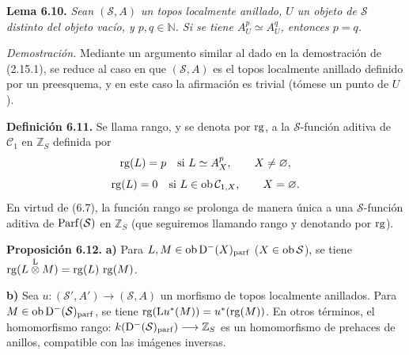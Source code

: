 
\providecommand{\sisi}[2]{#2}

\textbf{Lema 6.10.} \emph{Sean \((\sisi{S}{\mathcal S},A)\) un topos localmente anillado, \(U\) un objeto de \(\sisi{S}{\mathcal S}\) distinto del objeto vacío, y \(p,q\in\mathbb N\). Si se tiene \(A_U^p\simeq A_U^q\), entonces \(p=q\).}

\emph{Demostración.} Mediante un argumento similar al dado en la demostración de (2.15.1), se reduce al caso en que \((\sisi{S}{\mathcal S},A)\) es el topos localmente anillado definido por un preesquema, y en este caso la afirmación es trivial (tómese un punto de \(U\)).

\textbf{Definición 6.11.} Se llama rango, y se denota por \(\operatorname{rg}\), a la \(\sisi{S}{\mathcal S}\)-función aditiva de \(\mathcal C_1\) en \(\mathbb Z_S\) definida por
\[
  \operatorname{rg}(L)=p\quad\text{si } L\simeq A_X^p,
  \qquad X\ne\varnothing,
\]
\[
  \rg(L)=0\quad\text{si } L\in\Ob\sisi{\mathcal C_{1X}}{\mathcal C_{1,X}},
  \qquad X=\varnothing.
\]
En virtud de (6.7), la función rango se prolonga de manera única a una \(\sisi{S}{\mathcal S}\)-función aditiva de \(\Parf(\sisi{S}{\mathcal S})\) en \(\mathbb Z_S\) (que seguiremos llamando rango y denotando por \(\operatorname{rg}\)).

\textbf{Proposición 6.12.} \textbf{a)} Para \(L,M\in\operatorname{ob}\mathrm D^-(X)_{\mathrm{parf}}\) (\(X\in\Ob \sisi{S}{\mathcal S}\)), se tiene \(\operatorname{rg}(L\overset{\mathrm L}{\otimes} M)=\operatorname{rg}(L)\,\operatorname{rg}(M)\).

\textbf{b)} Sea \(u:(\sisi{S'}{\mathcal S'},A')\longrightarrow(\sisi{S}{\mathcal S},A)\) un morfismo de topos localmente anillados. Para \(M\in\Ob\Dpx^-(\sisi{S}{\mathcal S})_{\mathrm{parf}}\), se tiene \(\operatorname{rg}(\mathrm L u^*(M))=u^*(\operatorname{rg}(M))\). En otros términos, el homomorfismo rango: \(k(\Dpx^-(\sisi{S}{\mathcal S})_{\mathrm{parf}})\longrightarrow \mathbb Z_S\) es un homomorfismo de prehaces de anillos, compatible con las imágenes inversas.



